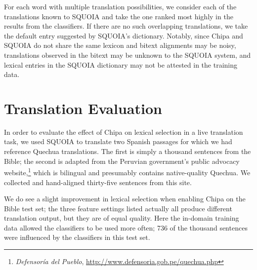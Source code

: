 For each word with multiple translation possibilities, we consider each of the
translations known to SQUOIA and take the one ranked most highly in the
results from the classifiers. If there are no such overlapping translations, we
take the default entry suggested by SQUOIA's dictionary.
Notably, since Chipa and SQUOIA do not share the same lexicon and bitext alignments
may be noisy, translations
observed in the bitext may be unknown to the SQUOIA system, and lexical entries in the
SQUOIA dictionary may not be attested in the training data.


\section{Translation Evaluation}
In order to evaluate the effect of Chipa on lexical selection in a live
translation task, we used SQUOIA to translate two Spanish passages for which we
had reference Quechua translations. The first is simply a thousand sentences
from the Bible; the second is adapted from the Peruvian government's public
advocacy website,\footnote{\emph{Defensoría del Pueblo},
\url{http://www.defensoria.gob.pe/quechua.php}} which is bilingual and
presumably contains native-quality Quechua. We collected and hand-aligned
thirty-five sentences from this site.


We do see a slight improvement in lexical selection when enabling Chipa on the
Bible test set; the three feature settings listed actually all produce
different translation output, but they are of equal quality. Here the in-domain
training data allowed the classifiers to be used more often; 736 of the
thousand sentences were influenced by the classifiers in this test set.
